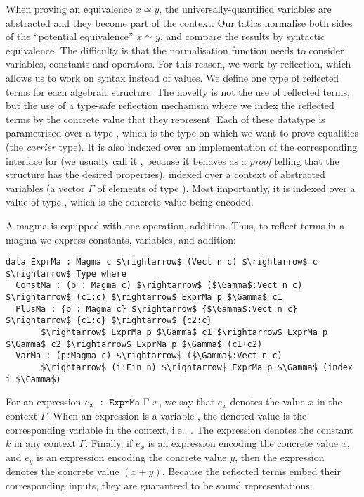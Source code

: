 When proving an equivalence $x \simeq y$, the universally-quantified
variables are abstracted and they become part of the context. Our
tatics normalise both sides of the ``potential equivalence'' $x
\simeq y$, and compare the results by syntactic equivalence. The
difficulty is that the normalisation function needs to consider
variables, constants and operators. For this
reason, we work by reflection, which allows us to work on syntax instead of values. We define one type of reflected
terms for each algebraic structure. The novelty is not the use of reflected
terms, but the use of a type-safe reflection
mechanism where we index the reflected terms by the concrete value that they
represent. Each of these datatype is parametrised over a type , which
is the type on which we want to prove equalities (the \emph{carrier}
type). It is also indexed over an implementation of the corresponding interface
for  (we usually call it , because it behaves as a \emph{proof}
telling that the structure  has the desired properties), indexed over a
context of abstracted variables (a vector $\Gamma$ of  elements of type
). Most importantly, it is indexed over a value of type ,
which is the concrete value being encoded.

A magma is equipped with one operation, addition. Thus, to reflect terms in a
magma we express constants, variables, and addition:

\begin{lstlisting}
data ExprMa : Magma c $\rightarrow$ (Vect n c) $\rightarrow$ c $\rightarrow$ Type where
  ConstMa : (p : Magma c) $\rightarrow$ ($\Gamma$:Vect n c) $\rightarrow$ (c1:c) $\rightarrow$ ExprMa p $\Gamma$ c1 
  PlusMa : {p : Magma c} $\rightarrow$ {$\Gamma$:Vect n c} $\rightarrow$ {c1:c} $\rightarrow$ {c2:c} 
       $\rightarrow$ ExprMa p $\Gamma$ c1 $\rightarrow$ ExprMa p $\Gamma$ c2 $\rightarrow$ ExprMa p $\Gamma$ (c1+c2) 
  VarMa : (p:Magma c) $\rightarrow$ ($\Gamma$:Vect n c)
       $\rightarrow$ (i:Fin n) $\rightarrow$ ExprMa p $\Gamma$ (index i $\Gamma$)
\end{lstlisting}


For an expression $e_x\ :\ \code{ExprMa}\ \Gamma\ x$, we say that $e_x$
denotes the value $x$ in the context $\Gamma$.  When an expression
is a variable , the denoted value is the
corresponding variable in the context, i.e., .  The
expression  denotes the constant $k$ in any context $\Gamma$. Finally, if $e_x$ is an expression encoding the concrete value $x$, and
$e_y$ is an expression encoding the concrete value $y$, then the expression
 denotes the concrete value $(x + y)$. Because the
reflected terms embed their corresponding inputs, they are guaranteed to be
sound representations.

